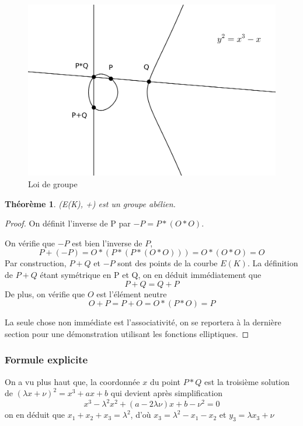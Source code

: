 \documentclass{article}
\newtheorem{theoreme}{Théorème}
\begin{document}
\begin{figure}[t]
\begin{center}
\includegraphics{cub.png}
\end{center}
\caption{Loi de groupe}
\label{loigpe}
\end{figure}

\begin{theoreme}
(E(K), +) est un groupe abélien.
\end{theoreme}

\begin{proof}
On définit l'inverse de P par $-P = P*(O*O)$.

On vérifie que $-P$ est bien l'inverse de $P$,
\begin{equation*}
P + (-P) = O*(P*(P*(O*O))) = O*(O*O) = O
\end{equation*}
Par construction, $P + Q$ et $-P$ sont des points de la courbe $E(K)$.
La définition de $P+Q$ étant symétrique en P et Q, on en déduit immédiatement que
\begin{equation*}
P+Q=Q+P
\end{equation*}
De plus, on vérifie que $O$ est l'élément neutre
\begin{equation*}
O+P=P+O=O*(P*O)=P
\end{equation*}

La seule chose non immédiate est l'associativité, on se reportera à la dernière section pour une
démonstration utilisant les fonctions elliptiques.
\end{proof}

\subsubsection{Formule explicite}
On a vu plus haut que, la coordonnée $x$ du point $P*Q$ est la troisième solution de
$(\lambda x + \nu)^2 = x^3 + ax + b$ qui devient après simplification
\begin{equation*}
x^{3} - \lambda^{2}x^2 + (a-2\lambda \nu)x + b - \nu^2 = 0
\end{equation*}
on en déduit que $x_{1} + x_{2} + x_{3} = \lambda^2$, d'où $x_{3} = \lambda^2 - x_{1} - x_{2}$
et $y_{3} = \lambda x_{3} + \nu$
\end{document}
